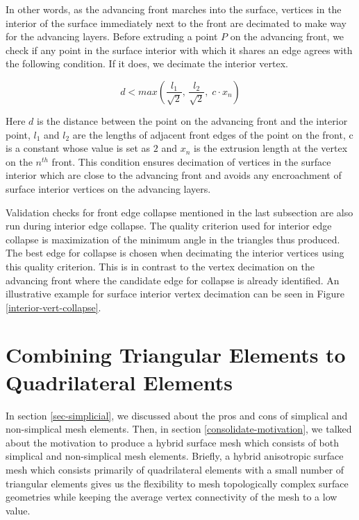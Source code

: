 In other words, as the advancing front marches into the surface, vertices in the interior of the surface immediately next to the front are decimated to make way for the advancing layers. Before extruding a point $P$ on the advancing front, we check if any point in the surface interior with which it shares an edge agrees with the following condition. If it does, we decimate the interior vertex.

\begin{equation}
    d < max \left( \frac{l_{1}}{\sqrt{2}}, \, \frac{l_{2}}{\sqrt{2}}, \; c \cdot  \mathit{x_n}\right)
    \label{collapse-eq}
\end{equation}

Here $d$ is the distance between the point on the advancing front and the interior point, $l_1$ and $l_2$ are the lengths of adjacent front edges of the point on the front, c is a constant whose value is set as $2$ and $x_n$ is the extrusion length at the vertex on the $n^{th}$ front. This condition ensures decimation of vertices in the surface interior which are close to the advancing front and avoids any encroachment of surface interior vertices on the advancing layers. 

Validation checks for front edge collapse mentioned in the last subsection are also run during interior edge collapse. The quality criterion used for interior edge collapse is maximization of the minimum angle in the triangles thus produced. The best edge for collapse is chosen when decimating the interior vertices using this quality criterion. This is in contrast to the vertex decimation on the advancing front where the candidate edge for collapse is already identified. An illustrative example for surface interior vertex decimation can be seen in Figure \ref{interior-vert-collapse}.

\section{Combining Triangular Elements to Quadrilateral Elements}

In section \ref{sec-simplicial}, we discussed about the pros and cons of simplical and non-simplical mesh elements. Then, in section \ref{consolidate-motivation}, we talked about the motivation to produce a hybrid surface mesh which consists of both simplical and non-simplical mesh elements. Briefly, a hybrid anisotropic surface mesh which consists primarily of quadrilateral elements with a small number of triangular elements gives us the flexibility to mesh topologically complex surface geometries while keeping the average vertex connectivity of the mesh to a low value.


